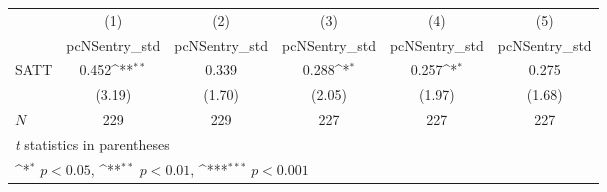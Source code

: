 {
\def\sym#1{\ifmmode^{#1}\else\(^{#1}\)\fi}
\begin{tabular}{l*{5}{c}}
\hline\hline
            &\multicolumn{1}{c}{(1)}&\multicolumn{1}{c}{(2)}&\multicolumn{1}{c}{(3)}&\multicolumn{1}{c}{(4)}&\multicolumn{1}{c}{(5)}\\
            &\multicolumn{1}{c}{pcNSentry\_std}&\multicolumn{1}{c}{pcNSentry\_std}&\multicolumn{1}{c}{pcNSentry\_std}&\multicolumn{1}{c}{pcNSentry\_std}&\multicolumn{1}{c}{pcNSentry\_std}\\
\hline
SATT        &       0.452\sym{**} &       0.339         &       0.288\sym{*}  &       0.257\sym{*}  &       0.275         \\
            &      (3.19)         &      (1.70)         &      (2.05)         &      (1.97)         &      (1.68)         \\
\hline
\(N\)       &         229         &         229         &         227         &         227         &         227         \\
\hline\hline
\multicolumn{6}{l}{\footnotesize \textit{t} statistics in parentheses}\\
\multicolumn{6}{l}{\footnotesize \sym{*} \(p<0.05\), \sym{**} \(p<0.01\), \sym{***} \(p<0.001\)}\\
\end{tabular}
}
